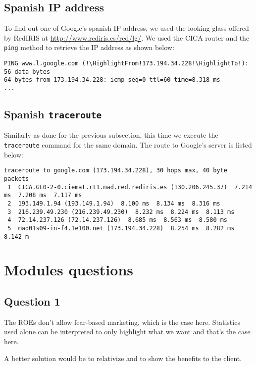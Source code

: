 \documentclass[10pt,a4paper,twoside,onecolumn]{article}
\begin{document}
\subsection{Spanish IP address}

To find out one of Google's spanish IP address, we used the looking glass offered by RedIRIS at \url{http://www.rediris.es/red/lg/}. We used the CICA router and the \texttt{ping} method to retrieve the IP address as shown below:

\begin{lstlisting}
PING www.l.google.com (!\HighlightFrom!173.194.34.228!\HighlightTo!): 56 data bytes
64 bytes from 173.194.34.228: icmp_seq=0 ttl=60 time=8.318 ms
...
\end{lstlisting}

\subsection{Spanish \texttt{traceroute}}

Similarly as done for the previous subsection, this time we execute the \texttt{traceroute} command for the same domain. The route to Google's server is listed below:

\begin{lstlisting}
traceroute to google.com (173.194.34.228), 30 hops max, 40 byte packets
 1  CICA.GE0-2-0.ciemat.rt1.mad.red.rediris.es (130.206.245.37)  7.214 ms  7.208 ms  7.117 ms
 2  193.149.1.94 (193.149.1.94)  8.100 ms  8.134 ms  8.316 ms
 3  216.239.49.230 (216.239.49.230)  8.232 ms  8.224 ms  8.113 ms
 4  72.14.237.126 (72.14.237.126)  8.685 ms  8.563 ms  8.580 ms
 5  mad01s09-in-f4.1e100.net (173.194.34.228)  8.254 ms  8.282 ms  8.142 m
\end{lstlisting}

\clearpage
\section{Modules questions}

\subsection{Question 1}

The ROEs don't allow fear-based marketing, which is the case here. Statistics used alone can be interpreted to only highlight what we want and that's the case here.

A better solution would be to relativize and to show the benefits to the client.
\end{document}
